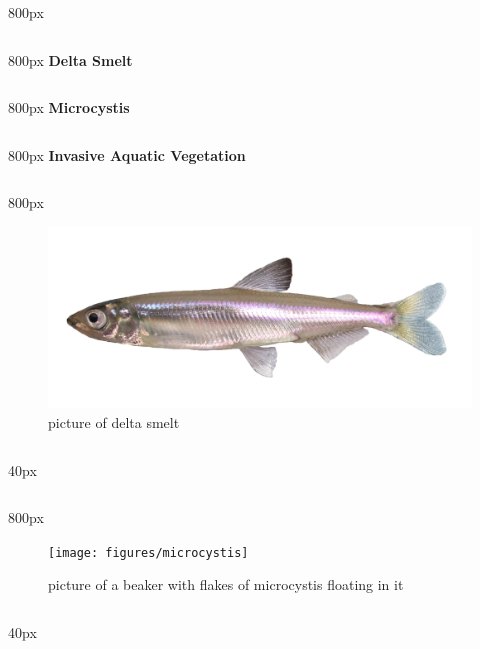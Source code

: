 \documentclass[
]{book}
\begin{document}
\begin{column}{800px\textwidth}
\end{column}

\begin{column}{800px\textwidth}
\textbf{Delta Smelt}
\end{column}

\begin{column}{800px\textwidth}
\textbf{Microcystis}
\end{column}

\begin{column}{800px\textwidth}
\textbf{Invasive Aquatic Vegetation}
\end{column}

\begin{column}{800px\textwidth}
\begin{figure}

{\centering \includegraphics[width=29.17in]{figures/delta_smelt} 

}

\caption{picture of delta smelt}\label{fig:unnamed-chunk-85}
\end{figure}
\end{column}

\begin{column}{40px\textwidth}
~
\end{column}

\begin{column}{800px\textwidth}
\begin{figure}

{\centering \texttt{[image: figures/microcystis]} 

}

\caption{picture of a beaker with flakes of microcystis floating in it}\label{fig:unnamed-chunk-86}
\end{figure}
\end{column}

\begin{column}{40px\textwidth}
~
\end{column}
\end{document}
